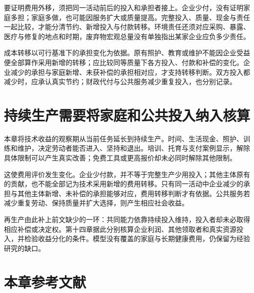 \documentclass[UTF8,fontset=windows,12pt,a4paper,oneside,openany]{ctexbook}
\begin{document}
要证明费用外移，须把同一活动前后的投入和承担者接上。企业少付，没有证明家庭多担；家庭多做，也可能因服务扩大或质量提高。完整投入、质量、现金与责任一起比较，才能分清节约、新增投入与付款转移。环境责任还须对应采购、暴露、医疗与修复的地点和时期，废弃物宏观总量没有单独指出某家企业应负多少责任。



成本转移以可行基准下的承担变化为依据。原有照护、教育或维护不能因企业受益便全部算作采用新增的转移；应比较同等质量下各方投入、付款和补偿的变化。企业减少的承担与家庭新增、未获补偿的承担相对应，才支持转移判断。双方投入都减少时，应承认真实节约；财政代付与公共服务减少重复投入，也分别记录。

\section{持续生产需要将家庭和公共投入纳入核算}

本章将技术收益的观察期从当前任务延长到持续生产。时间、生活现金、照护、训练和维护，决定劳动者能否进入、坚持和退出。培训、托育与支付案例显示，解除具体限制可以产生真实改善；免费工具或更高报价却未必同时解除其他限制。

这使费用评价发生变化。企业少付款，并不等于完整生产少用投入；其他主体原有的贡献，也不能全部记为技术采用新增的费用转移。只有同一活动中企业减少的承担与其他主体新增、未补偿的承担能够对应，费用转移判断才有依据。公共服务若减少重复劳动、保持质量并扩大选择，则产生相应社会收益。

再生产由此补上前文缺少的一环：共同能力依靠持续投入维持，投入者却未必取得相应补偿或决定权。第十四章据此分别核算企业利润、其他领取者和真实资源投入，并检验收益分化的条件。模型没有覆盖的家庭与长期健康费用，仍保留为经验研究的缺口。

\section*{本章参考文献}
\end{document}
